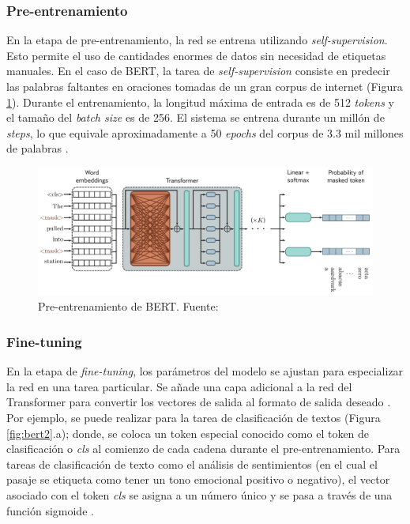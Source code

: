 \subsubsection{Pre-entrenamiento}

En la etapa de pre-entrenamiento, la red se entrena utilizando \textit{self-supervision}. Esto permite el uso de cantidades enormes de datos sin necesidad de etiquetas manuales. En el caso de BERT, la tarea de \textit{self-supervision} consiste en predecir las palabras faltantes en oraciones tomadas de un gran corpus de internet (Figura \ref{fig:bert}). Durante el entrenamiento, la longitud máxima de entrada es de 512 \textit{tokens} y el tamaño del \textit{batch size} es de 256. El sistema se entrena durante un millón de \textit{steps}, lo que equivale aproximadamente a 50 \textit{epochs} del corpus de 3.3 mil millones de palabras \citep{prince2023understanding}.

\begin{figure}[H]
	\centering
	\includegraphics[width=\textwidth]{../img/theory/pre-training}
	\caption{Pre-entrenamiento de BERT. Fuente: \cite{prince2023understanding}}
	\label{fig:bert}
\end{figure}


\subsubsection{Fine-tuning}



En la etapa de \textit{fine-tuning}, los parámetros del modelo se ajustan para especializar la red en una tarea particular. Se añade una capa adicional a la red del Transformer para convertir los vectores de salida al formato de salida deseado \citep{prince2023understanding}. Por ejemplo, se puede realizar  para la tarea de clasificación de textos (Figura \ref{fig:bert2}.a); donde, se coloca un token especial conocido como el token de clasificación o \textit{cls} al comienzo de cada cadena durante el pre-entrenamiento. Para tareas de clasificación de texto como el análisis de sentimientos (en el cual el pasaje se etiqueta como tener un tono emocional positivo o negativo), el vector asociado con el token \textit{cls} se asigna a un número único y se pasa a través de una función sigmoide \citep{prince2023understanding}.

